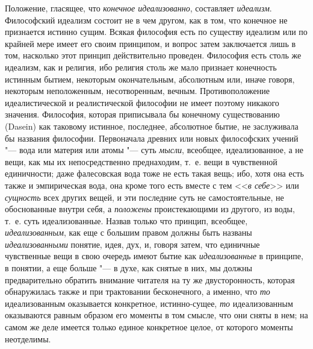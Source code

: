 Положение, гласящее, что {\em конечное идеализованно},
составляет {\em идеализм}. Философский идеализм состоит
не в чем другом, как в том, что конечное не признается истинно сущим.
Всякая философия есть по существу идеализм или по крайней мере имеет его
своим принципом, и вопрос затем заключается лишь в том, насколько этот
принцип действительно проведен. Философия есть столь же идеализм, как и
религия, ибо религия столь же мало признает конечность истинным бытием,
некоторым окончательным, абсолютным или, иначе говоря, некоторым
неположенным, несотворенным, вечным. Противоположение идеалистической и
реалистической философии не имеет поэтому никакого значения. Философия,
которая приписывала бы конечному существованию (Dasein) как таковому
истинное, последнее, абсолютное бытие, не заслуживала бы названия
философии. Первоначала древних или новых философских учений "--- вода или
материя или атомы "--- суть {\em мысли}, всеобщее,
идеализованное, а не вещи, как мы их непосредственно преднаходим, т.~е.
вещи в чувственной единичности; даже фалесовская вода тоже не есть такая
вещь; ибо, хотя она есть также и эмпирическая вода, она кроме того есть
вместе с тем <<{\em в себе}>> или
{\em сущность} всех других вещей, и эти последние суть
не самостоятельные, не обоснованные внутри себя, а
{\em положены} проистекающими из другого, из
воды, т.~е. суть идеализованные. Назвав только что принцип, всеобщее,
{\em идеализованным}, как еще с большим правом должны
быть названы {\em идеализованными} понятие, идея, дух,
и, говоря затем, что единичные чувственные вещи в свою очередь имеют бытие
как {\em идеализованные} в принципе, в понятии, а еще
больше "--- в духе, как снятые в них, мы должны предварительно обратить
внимание читателя на ту же двусторонность, которая обнаружилась также и при
трактовании бесконечного, а именно, что {\em то}
идеализованным оказывается конкретное, истинно-сущее,
{\em то} идеализованным оказываются равным образом его
моменты в том смысле, что они сняты в нем; на самом же деле имеется только
единое конкретное целое, от которого моменты неотделимы.


